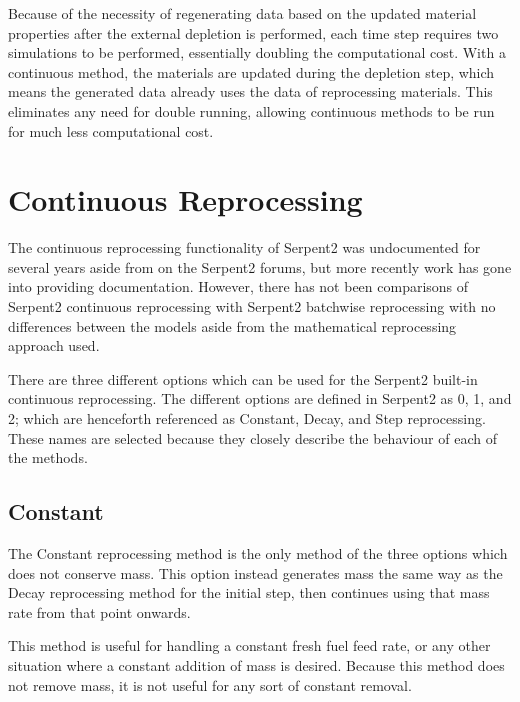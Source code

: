 Because of the necessity of regenerating data based on the updated material properties after the external depletion is performed, each time step requires two simulations to be performed, essentially doubling the computational cost. With a continuous method, the materials are updated during the depletion step, which means the generated data already uses the data of reprocessing materials. This eliminates any need for double running, allowing continuous methods to be run for much less computational cost.

\section{Continuous Reprocessing}

The continuous reprocessing functionality of Serpent2 was undocumented for several years aside from on the Serpent2 forums, but more recently work has gone into providing documentation. However, there has not been comparisons of Serpent2 continuous reprocessing with Serpent2 batchwise reprocessing with no differences between the models aside from the mathematical reprocessing approach used.

There are three different options which can be used for the Serpent2 built-in continuous reprocessing. The different options are defined in Serpent2 as 0, 1, and 2; which are henceforth referenced as Constant, Decay, and Step reprocessing. These names are selected because they closely describe the behaviour of each of the methods.

\subsection{Constant}
The Constant reprocessing method is the only method of the three options which does not conserve mass. This option instead generates mass the same way as the Decay reprocessing method for the initial step, then continues using that mass rate from that point onwards.

This method is useful for handling a constant fresh fuel feed rate, or any other situation where a constant addition of mass is desired. Because this method does not remove mass, it is not useful for any sort of constant removal.

